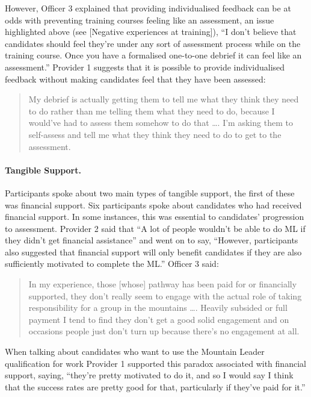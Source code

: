 \documentclass[
  12pt,
  a4paper,
]{book}
\begin{document}
However, Officer 3 explained that providing individualised feedback can be at odds with preventing training courses feeling like an assessment, an issue highlighted above (see {[}Negative experiences at training{]}), ``I don't believe that candidates should feel they're under any sort of assessment process while on the training course. Once you have a formalised one-to-one debrief it can feel like an assessment.'' Provider 1 suggests that it is possible to provide individualised feedback without making candidates feel that they have been assessed:

\begin{quote}
My debrief is actually getting them to tell me what they think they need to do rather than me telling them what they need to do, because I would've had to assess them somehow to do that \ldots. I'm asking them to self-assess and tell me what they think they need to do to get to the assessment.
\end{quote}

\hypertarget{tangible-support.}{%
\paragraph{Tangible Support.}\label{tangible-support.}}

Participants spoke about two main types of tangible support, the first of these was financial support. Six participants spoke about candidates who had received financial support. In some instances, this was essential to candidates' progression to assessment. Provider 2 said that ``A lot of people wouldn't be able to do ML if they didn't get financial assistance'' and went on to say, ``However, participants also suggested that financial support will only benefit candidates if they are also sufficiently motivated to complete the ML.'' Officer 3 said:

\begin{quote}
In my experience, those {[}whose{]} pathway has been paid for or financially supported, they don't really seem to engage with the actual role of taking responsibility for a group in the mountains \ldots. Heavily subsided or full payment I tend to find they don't get a good solid engagement and on occasions people just don't turn up because there's no engagement at all.
\end{quote}

When talking about candidates who want to use the Mountain Leader qualification for work Provider 1 supported this paradox associated with financial support, saying, ``they're pretty motivated to do it, and so I would say I think that the success rates are pretty good for that, particularly if they've paid for it.''
\end{document}
